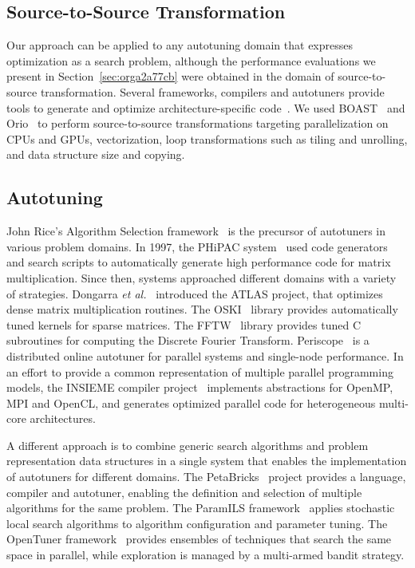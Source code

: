 \documentclass[conference]{IEEEtran}
\begin{document}
\subsection{Source-to-Source Transformation}
\label{sec:orgbcd68cb}
Our approach can be applied to any autotuning domain that expresses optimization
as a search problem, although the performance evaluations we present in
Section~\ref{sec:orga2a77cb} were obtained in the domain of
source-to-source transformation. Several frameworks, compilers and autotuners
provide tools to generate and optimize architecture-specific
code~\cite{hartono2009annotation,videau2017boast,tiwari2009scalable,yi2007poet,ansel2009petabricks}.
We used BOAST~\cite{videau2017boast} and
Orio~\cite{hartono2009annotation} to perform source-to-source
transformations targeting parallelization on CPUs and GPUs, vectorization, loop
transformations such as tiling and unrolling, and data structure size and
copying.
\subsection{Autotuning}
\label{sec:org9e40db1}
John Rice's Algorithm Selection framework~\cite{rice1976algorithm} is the
precursor of autotuners in various problem domains. In 1997, the PHiPAC
system~\cite{bilmes1997optimizing} used code generators and search scripts
to automatically generate high performance code for matrix multiplication. Since
then, systems approached different domains with a variety of strategies.
Dongarra \emph{et al.}~\cite{dongarra1998automatically} introduced the ATLAS
project, that optimizes dense matrix multiplication routines. The
OSKI~\cite{vuduc2005oski} library provides automatically tuned kernels for
sparse matrices. The FFTW~\cite{frigo1998fftw} library provides tuned C
subroutines for computing the Discrete Fourier Transform.
Periscope~\cite{gerndt2010automatic} is a distributed online autotuner for
parallel systems and single-node performance. In an effort to provide a common
representation of multiple parallel programming models, the INSIEME compiler
project~\cite{jordan2012multi} implements abstractions for OpenMP, MPI and
OpenCL, and generates optimized parallel code for heterogeneous multi-core
architectures.

A different approach is to combine generic search algorithms and problem
representation data structures in a single system that enables the
implementation of autotuners for different domains. The
PetaBricks~\cite{ansel2009petabricks} project provides a language,
compiler and autotuner, enabling the definition and selection of multiple
algorithms for the same problem. The ParamILS
framework~\cite{hutter2009paramils} applies stochastic local search
algorithms to algorithm configuration and parameter tuning. The OpenTuner
framework~\cite{ansel2014opentuner} provides ensembles of techniques that
search the same space in parallel, while exploration is managed by a multi-armed
bandit strategy.
\end{document}
